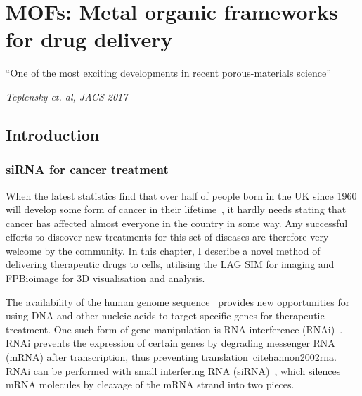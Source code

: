 \chapter{MOFs: Metal organic frameworks for drug delivery} \label{chap:MOF}


\ifpdf
    \graphicspath{{Chapter4/Figs/Raster/}{Chapter4/Figs/PDF/}{Chapter4/Figs/}}
\else
    \graphicspath{{Chapter4/Figs/Vector/}{Chapter4/Figs/}}
\fi

``One of the most exciting developments in recent porous-materials science''

\textit{Teplensky et. al, JACS 2017}~\cite{teplensky2017temperature}

\section{Introduction} \label{sec:MOF-intro}
\subsection{siRNA for cancer treatment}
When the latest statistics find that over half of people born in the UK since 1960 will develop some form of cancer in their lifetime~\cite{ahmad2015trends}, it hardly needs stating that cancer has affected almost everyone in the country in some way. 
Any successful efforts to discover new treatments for this set of diseases are therefore very welcome by the community. 
In this chapter, I describe a novel method of delivering therapeutic drugs to cells, utilising the LAG SIM for imaging and FPBioimage for 3D visualisation and analysis. 

The availability of the human genome sequence~\cite{venter2001sequence, bentley2008accurate} provides new opportunities for using DNA and other nucleic acids to target specific genes for therapeutic treatment. 
One such form of gene manipulation is RNA interference (RNAi)~\cite{fire1998potent, timmons1998specific}. 
RNAi prevents the expression of certain genes by degrading messenger RNA (mRNA) after transcription, thus preventing translation~cite{hannon2002rna}. 
RNAi can be performed with small interfering RNA (siRNA)~\cite{hamilton1999species, elbashir2001duplexes}, which silences mRNA molecules by cleavage of the mRNA strand into two pieces. 

